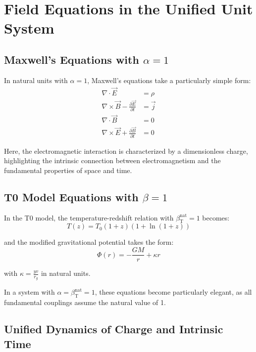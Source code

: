 \documentclass[12pt,a4paper]{article}
\newcommand{\betaT}{\beta_{\text{T}}}
\begin{document}
	\section{Field Equations in the Unified Unit System}
	
	\subsection{Maxwell’s Equations with \(\alpha = 1\)}
	
	In natural units with \(\alpha = 1\), Maxwell’s equations take a particularly simple form:
	\begin{align}
		\nabla \cdot \vec{E} &= \rho \\
		\nabla \times \vec{B} - \frac{\partial \vec{E}}{\partial t} &= \vec{j} \\
		\nabla \cdot \vec{B} &= 0 \\
		\nabla \times \vec{E} + \frac{\partial \vec{B}}{\partial t} &= 0
	\end{align}
	
	Here, the electromagnetic interaction is characterized by a dimensionless charge, highlighting the intrinsic connection between electromagnetism and the fundamental properties of space and time.
	
	\subsection{T0 Model Equations with \(\beta = 1\)}
	
	In the T0 model, the temperature-redshift relation with \(\betaT^{\text{nat}} = 1\) becomes:
	\begin{equation}
		T(z) = T_0 (1+z)(1+\ln(1+z))
	\end{equation}
	
	and the modified gravitational potential takes the form:
	\begin{equation}
		\Phi(r) = -\frac{G M}{r} + \kappa r
	\end{equation}
	
	with \(\kappa = \frac{y v}{r_g}\) in natural units.
	
	In a system with \(\alpha = \betaT^{\text{nat}} = 1\), these equations become particularly elegant, as all fundamental couplings assume the natural value of 1.
	
	\subsection{Unified Dynamics of Charge and Intrinsic Time}
	
\end{document}
